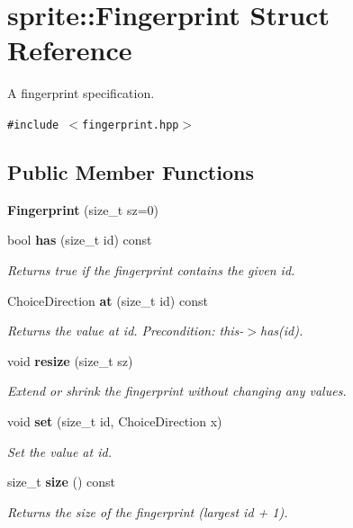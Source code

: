 \section{sprite::Fingerprint Struct Reference}
\label{structsprite_1_1Fingerprint}
A fingerprint specification.  


{\tt \#include $<$fingerprint.hpp$>$}

\subsection*{Public Member Functions}
\begin{CompactItemize}
\item 
{\bf Fingerprint} (size\_\-t sz=0)
\item 
bool {\bf has} (size\_\-t id) const \label{structsprite_1_1Fingerprint_a1}

\begin{CompactList}\small\item\em Returns true if the fingerprint contains the given id. \item\end{CompactList}\item 
Choice\-Direction {\bf at} (size\_\-t id) const \label{structsprite_1_1Fingerprint_a2}

\begin{CompactList}\small\item\em Returns the value at id. Precondition: this-$>$has(id). \item\end{CompactList}\item 
void {\bf resize} (size\_\-t sz)\label{structsprite_1_1Fingerprint_a3}

\begin{CompactList}\small\item\em Extend or shrink the fingerprint without changing any values. \item\end{CompactList}\item 
void {\bf set} (size\_\-t id, Choice\-Direction x)\label{structsprite_1_1Fingerprint_a4}

\begin{CompactList}\small\item\em Set the value at id. \item\end{CompactList}\item 
size\_\-t {\bf size} () const \label{structsprite_1_1Fingerprint_a5}

\begin{CompactList}\small\item\em Returns the size of the fingerprint (largest id + 1). \item\end{CompactList}\end{CompactItemize}


